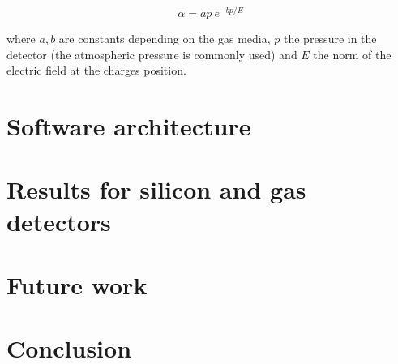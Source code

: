 \documentclass[11pt]{article}
\begin{document}
\[\alpha = ap \ e^{-bp/E}\]

where $a, b$ are constants depending on the gas media, $p$ the pressure in
the detector (the atmospheric pressure is commonly used) and $E$ the norm
of the electric field at the charges position.

\section{Software architecture}

\section{Results for silicon and gas detectors}

\section{Future work}

\section{Conclusion}

\newpage



\end{document}
